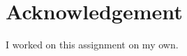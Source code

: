 \documentclass[10pt, a4paper]{article}
\begin{document}
{\begin{enumerate}
\end{enumerate}


\section{Acknowledgement}
I worked on this assignment on my own.


}

\makereferences


\end{document}
